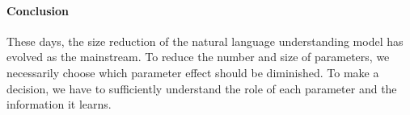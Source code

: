 \documentclass[letterpaper, 11pt]{article}
\begin{document}
\paragraph{Conclusion} These days, the size reduction of the natural language understanding model has evolved as the mainstream. To reduce the number and size of parameters, we necessarily choose which parameter effect should be diminished. To make a decision, we have to sufficiently understand the role of each parameter and the information it learns.



\end{document}

